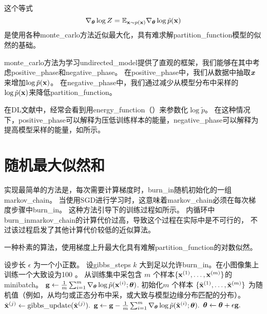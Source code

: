 这个等式
\begin{equation}
\label{eq:18.15}
	\nabla_{\boldsymbol{\theta}} \log Z = \mathbb{E}_{\mathbf{x} \sim p(\mathbf{x})} \nabla_{\boldsymbol{\theta}} \log \tilde{p}(\mathbf{x})
\end{equation}
是使用各种\gls{monte_carlo}方法近似最大化，具有难求解\gls{partition_function}模型的似然的基础。


\gls{monte_carlo}方法为学习\gls{undirected_model}提供了直观的框架，我们能够在其中考虑\gls{positive_phase}和\gls{negative_phase}。
在\gls{positive_phase}中，我们从数据中抽取$\boldsymbol{\mathit{x}}$来增加$\log \tilde{p}(\mathbf{x})$。
在\gls{negative_phase}中，我们通过减少从模型分布中采样的$\log \tilde{p}(\mathbf{x})$来降低\gls{partition_function}。


在\gls{DL}文献中，经常会看到用\gls{energy_function}（）来参数化$\log \tilde{p}$。
在这种情况下，\gls{positive_phase}可以解释为压低训练样本的能量，\gls{negative_phase}可以解释为提高模型采样的能量，如所示。


\section{随机最大似然和}
\label{sec:stochastic_maximum_likelihood_and_contrastive_divergence}
实现最简单的方法是，每次需要计算梯度时，\gls{burn_in}随机初始化的一组\gls{markov_chain}。
当使用\gls{SGD}进行学习时，这意味着\gls{markov_chain}必须在每次梯度步骤中\gls{burn_in}。
这种方法引导下的训练过程如所示。
内循环中\gls{burn_in}\gls{markov_chain}的计算代价过高，导致这个过程在实际中是不可行的，
不过该过程启发了其他计算代价较低的近似算法。

\begin{algorithm}[ht]
\caption{一种朴素的算法，使用梯度上升最大化具有难解\gls{partition_function}的对数似然。}
\label{alg:naive_cd}
\begin{algorithmic}
\STATE 设步长 $\epsilon$ 为一个小正数。
\STATE 设\gls{gibbs_steps} $k$ 大到足以允许\gls{burn_in}。在小图像集上训练一个大致设为100 。
\STATE 从训练集中采包含 $m$ 个样本$\{ \mathbf{x}^{(1)}, \dots, \mathbf{x}^{(m)}\}$的\gls{minibatch}。
\STATE $\mathbf{g} \leftarrow \frac{1}{m} \sum_{i=1}^m \nabla_{\boldsymbol{\theta}} \log \tilde{p}(\mathbf{x}^{(i)}; \boldsymbol{\theta})$.
\STATE 初始化$m$ 个样本 $\{ \tilde{\mathbf{x}}^{(1)}, \dots, \tilde{\mathbf{x}}^{(m)} \}$ 为随机值（例如，从均匀或正态分布中采，或大致与模型边缘分布匹配的分布）。
        \STATE $\tilde{\mathbf{x}}^{(j)} \leftarrow \text{gibbs\_update}(\tilde{\mathbf{x}}^{(j)}).$
    \ENDFOR
\ENDFOR
\STATE $\mathbf{g} \leftarrow \mathbf{g} - \frac{1}{m} \sum_{i=1}^m \nabla_{\boldsymbol{\theta}} \log \tilde{p}( \tilde{\mathbf{x}}^{(i)} ; \boldsymbol{\theta} ).$
\STATE $\boldsymbol{\theta} \leftarrow \boldsymbol{\theta} + \epsilon \mathbf{g}.$
\ENDWHILE
\end{algorithmic}
\end{algorithm}


